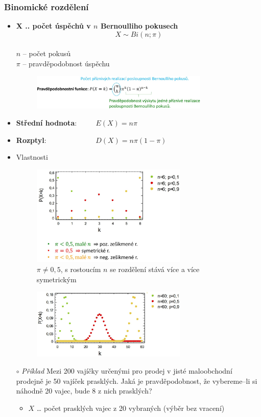 \subsubsection{Binomické rozdělení}
\begin{itemize}
	\item \textbf{X .. počet úspěchů v $n$ Bernoulliho pokusech} $$X \sim Bi(n;\pi)$$ \\ $n$ -- počet pokusů \\ $\pi$ -- pravděpodobnost úspěchu
 	\begin{figure}[H]
	\centering
	\includegraphics[width=0.8\textwidth]{assets/12_binom}
	\end{figure}
	\item \textbf{Střední hodnota}: $\qquad$ $E(X) = n\pi$
	\item \textbf{Rozptyl}: $\qquad\qquad\qquad\;\; D(X) = n\pi(1 - \pi)$
	\item Vlastnosti
	\begin{figure}[H]
	\centering
	\includegraphics[width=0.7\textwidth]{assets/12_binom_vlast}
	\caption{$\pi \not= 0,5$, s rostoucím $n$ se rozdělení stává více a více symetrickým}
	\end{figure}
	\begin{figure}[H]
	\centering
	\includegraphics[width=0.7\textwidth]{assets/12_binom_vlast2}
	\end{figure}
	\item[$\circ$] \textit{Příklad} Mezi 200 vajíčky určenými pro prodej v jisté maloobchodní prodejně je 50 vajíček prasklých. Jaká je pravděpodobnost, že vybereme--li si náhodně 20 vajec, bude 8 z nich prasklých?
	\begin{itemize}
		\item $X$ … počet prasklých vajec z 20 vybraných (výběr bez vracení)


\end{itemize}
\end{itemize}

